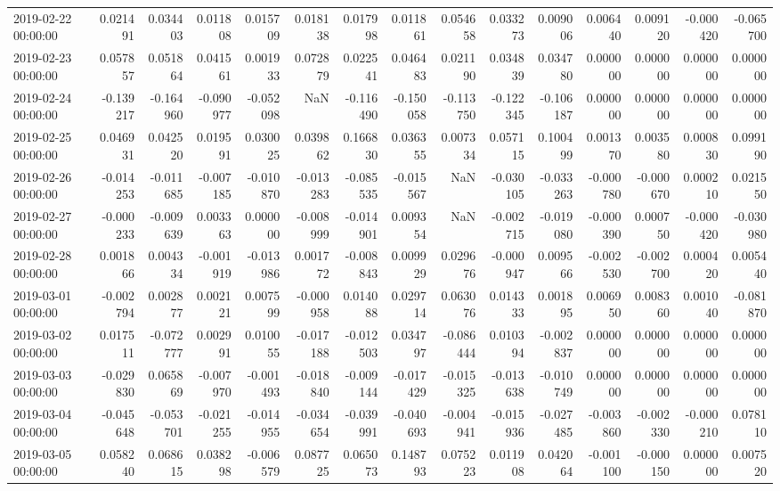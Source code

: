 \begin{tabular}{lrrrrrrrrrrrrrr}
2019-02-22 00:00:00 & 0.021491 & 0.034403 & 0.011808 & 0.015709 & 0.018138 & 0.017998 & 0.011861 & 0.054658 & 0.033273 & 0.009006 & 0.006440 & 0.009120 & -0.000420 & -0.065700 \\
2019-02-23 00:00:00 & 0.057857 & 0.051864 & 0.041561 & 0.001933 & 0.072879 & 0.022541 & 0.046483 & 0.021190 & 0.034839 & 0.034780 & 0.000000 & 0.000000 & 0.000000 & 0.000000 \\
2019-02-24 00:00:00 & -0.139217 & -0.164960 & -0.090977 & -0.052098 & NaN & -0.116490 & -0.150058 & -0.113750 & -0.122345 & -0.106187 & 0.000000 & 0.000000 & 0.000000 & 0.000000 \\
2019-02-25 00:00:00 & 0.046931 & 0.042520 & 0.019591 & 0.030025 & 0.039862 & 0.166830 & 0.036355 & 0.007334 & 0.057115 & 0.100499 & 0.001370 & 0.003580 & 0.000830 & 0.099190 \\
2019-02-26 00:00:00 & -0.014253 & -0.011685 & -0.007185 & -0.010870 & -0.013283 & -0.085535 & -0.015567 & NaN & -0.030105 & -0.033263 & -0.000780 & -0.000670 & 0.000210 & 0.021550 \\
2019-02-27 00:00:00 & -0.000233 & -0.009639 & 0.003363 & 0.000000 & -0.008999 & -0.014901 & 0.009354 & NaN & -0.002715 & -0.019080 & -0.000390 & 0.000750 & -0.000420 & -0.030980 \\
2019-02-28 00:00:00 & 0.001866 & 0.004334 & -0.001919 & -0.013986 & 0.001772 & -0.008843 & 0.009929 & 0.029676 & -0.000947 & 0.009566 & -0.002530 & -0.002700 & 0.000420 & 0.005440 \\
2019-03-01 00:00:00 & -0.002794 & 0.002877 & 0.002121 & 0.007599 & -0.000958 & 0.014088 & 0.029714 & 0.063076 & 0.014333 & 0.001895 & 0.006950 & 0.008360 & 0.001040 & -0.081870 \\
2019-03-02 00:00:00 & 0.017511 & -0.072777 & 0.002991 & 0.010055 & -0.017188 & -0.012503 & 0.034797 & -0.086444 & 0.010394 & -0.002837 & 0.000000 & 0.000000 & 0.000000 & 0.000000 \\
2019-03-03 00:00:00 & -0.029830 & 0.065869 & -0.007970 & -0.001493 & -0.018840 & -0.009144 & -0.017429 & -0.015325 & -0.013638 & -0.010749 & 0.000000 & 0.000000 & 0.000000 & 0.000000 \\
2019-03-04 00:00:00 & -0.045648 & -0.053701 & -0.021255 & -0.014955 & -0.034654 & -0.039991 & -0.040693 & -0.004941 & -0.015936 & -0.027485 & -0.003860 & -0.002330 & -0.000210 & 0.078110 \\
2019-03-05 00:00:00 & 0.058240 & 0.068615 & 0.038298 & -0.006579 & 0.087725 & 0.065073 & 0.148793 & 0.075223 & 0.011908 & 0.042064 & -0.001100 & -0.000150 & 0.000000 & 0.007520 \\

\end{tabular}
